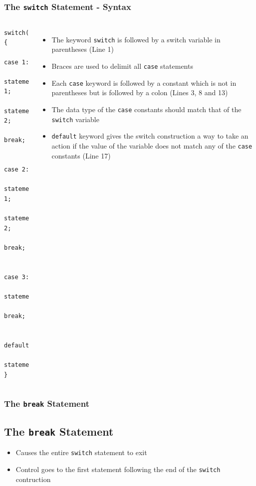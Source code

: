 \documentclass{beamer}
\begin{document}
\begin{frame}[fragile]
    \frametitle{The \texttt{switch} Statement - Syntax}
    \begin{columns}
        \lstset{style=mystyle}
        \begin{lstlisting}
switch(n)
{
    case 1:
    statement 1;
    statement 2;
    break;

    case 2:
    statement 1;
    statement 2;
    break;

    case 3:
    statement;
    break;

    default:
    statement;
}
\end{lstlisting}
            \begin{itemize}
            \item The keyword \texttt{switch} is followed by a switch variable in parentheses (Line 1)
            \item Braces are used to delimit all \texttt{case} statements
            \item Each \texttt{case} keyword is followed by a constant which is not in parentheses but is followed by a colon (Lines 3, 8 and 13)
            \item The data type of the \texttt{case} constants should match that of the \texttt{switch} variable
            \item \texttt{default} keyword gives the switch construction a way to take an action if the value of the variable does not match any of the \texttt{case} constants (Line 17)
            \end{itemize}
    \end{columns}
\end{frame}

\begin{frame}
    \frametitle{The \texttt{break} Statement}
    \subsection{The \texttt{break} Statement} %
    \label{sub:the_break_statement}
    \begin{itemize}
        \item Causes the entire \texttt{switch} statement to exit
        \item Control goes to the first statement following the end of the \texttt{switch} contruction
    \end{itemize}
\end{frame}
\end{document}

